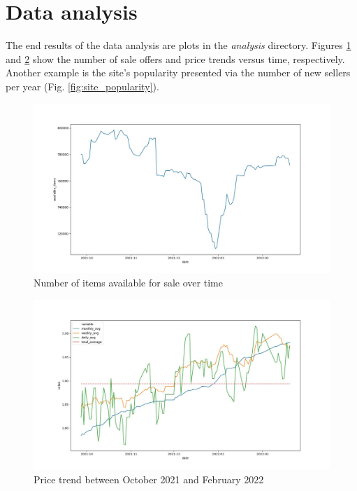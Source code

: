 \section{Data analysis}
The end results of the data analysis are plots in the \textit{analysis} directory. Figures \ref{fig:available_items} and \ref{fig:price_chart} show the number of sale offers and price trends versus time, respectively. Another example is the site's popularity presented via the number of new sellers per year (Fig. \ref{fig:site_popularity}). \par

\begin{figure}
    \centering
    \includegraphics[width=\textwidth]{figures/available_items.jpg}
    \caption{Number of items available for sale over time}
    \label{fig:available_items}
\end{figure}

\begin{figure}
    \centering
    \includegraphics[width=\textwidth]{figures/price_chart.jpg}
    \caption{Price trend between October 2021 and February 2022}
    \label{fig:price_chart}
\end{figure}

